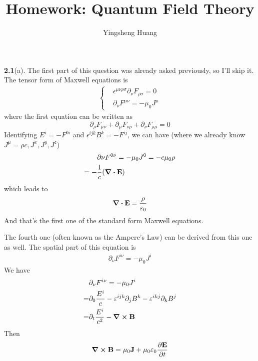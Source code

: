 \documentclass{article}
\title{Homework: Quantum Field Theory}
\author{Yingsheng Huang}
\begin{document}
\maketitle

{\bf2.1}\quad(a). The first part of this question was already asked previously, so I'll skip it. The tensor form of Maxwell equations is
\begin{align}
 \begin{cases}
   &\epsilon^{\mu\nu\rho\sigma}\partial_{\nu}F_{\rho\sigma}=0\\
   &\partial_{\nu}F^{\mu\nu}=-\mu_0J^{\mu}
 \end{cases}
\end{align}
where the first equation can be written as
\begin{equation*}
  \partial_{\rho}F_{\mu\nu}+\partial_{\mu}F_{\nu\rho}+\partial_{\nu}F_{\rho\mu}=0
\end{equation*}
Identifying $E^i=-F^{0i}$ and $\epsilon^{ijk}B^k=-F^{ij}$, we can have (where we already know $J^{\mu}={\rho c,J^x,J^y,J^z}$)
\begin{align*}
&\partial{\nu}F^{0\nu}=-\mu_0J^0=-c\mu_0\rho\\
=-&\frac{1}{c}(\div{\vb{E}})
\end{align*}
which leads to
\begin{align}
\div{\vb{E}}=\frac{\rho}{\varepsilon_0}
\end{align}
And that's the first one of the standard form Maxwell equations.

The fourth one (often known as the Ampere's Law) can be derived from this one as well. The spatial part of this equation is
\begin{align*}
\partial_{\nu}F^{i\nu}=-\mu_0J^i
\end{align*}
We have
\begin{align*}
  &\partial_{\nu}F^{i\nu}=-\mu_0J^i\\
  =&\partial_0\frac{E^i}{c}-\varepsilon^{ijk}\partial_jB^k-\varepsilon^{ikj}\partial_kB^j\\
  =&\partial_t\frac{E^i}{c^2}-\curl{\vb{B}}
\end{align*}
Then
\begin{align}
 \curl{\vb{B}}=\mu_0\vb{J}+\mu_0\varepsilon_0\pdv{\vb{E}}{t}
\end{align}
\end{document}
